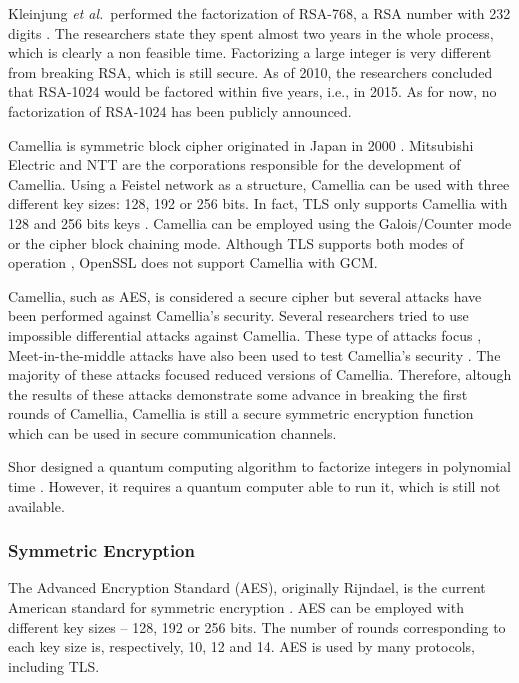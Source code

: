 \documentclass{sig-alternate-05-2015}
\begin{document}
Kleinjung \emph{et al.}~performed the factorization of RSA-768, a RSA number with 232 digits \cite{Kleinjung2010}. The researchers state they spent almost two years in the whole process, which is clearly a non feasible time.
Factorizing a large integer is  very different  from breaking RSA, which is still secure.
As of 2010, the researchers concluded that RSA-1024 would be factored within five years, i.e., in 2015. As for now, no factorization of RSA-1024 has been publicly announced.

Camellia is symmetric block cipher originated in Japan in 2000 \cite{RFC3713, RFC5528}. Mitsubishi Electric and NTT are the corporations responsible
for the development of Camellia. Using a Feistel network as a structure, Camellia can be used with three different key sizes: 128, 192 or 256 bits.
In fact, TLS only supports Camellia with 128 and 256 bits keys \cite{RFC5932}. Camellia can be employed using the Galois/Counter mode or the cipher
block chaining mode. Although TLS supports both modes of operation \cite{RFC6367}, OpenSSL does not support Camellia with GCM.

Camellia, such as AES, is considered a secure cipher but several attacks have been performed against Camellia's security.
Several researchers tried to use impossible differential attacks against Camellia. These type of attacks focus \cite{Blondeau2015660},
Meet-in-the-middle attacks have also been used to test Camellia's security \cite{Li2014:292, Lu2012}. The majority of these attacks focused reduced
versions of Camellia. Therefore, altough the results of these attacks demonstrate some advance in breaking the first rounds of Camellia, Camellia
is still a secure symmetric encryption function which can be used in secure communication channels.

Shor designed a quantum computing algorithm to factorize integers in polynomial time \cite{Shor1995}. However, it requires a quantum computer able to run it, which is still not available.


\subsubsection{Symmetric Encryption}

The Advanced Encryption Standard (AES), originally  Rijndael, 
is the current American standard for symmetric encryption 
\cite{Rijmen2001}. AES can be employed with different key sizes -- 128, 192 or 256 bits. The number of rounds corresponding to each key size is, respectively, 10, 12 and 14.
AES is used by many protocols, including TLS. 
\end{document}
